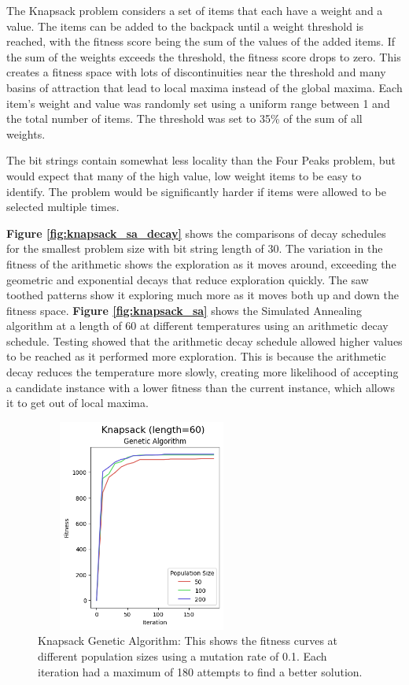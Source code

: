 \documentclass[letterpaper]{article} %
\begin{document}
The Knapsack problem considers a set of items that each have a weight and a value.  The items can be added to the backpack until a weight threshold is reached, with the fitness score being the sum of the values of the added items.  If the sum of the weights exceeds the threshold, the fitness score drops to zero.  This creates a fitness space with lots of discontinuities near the threshold and many basins of attraction that lead to local maxima instead of the global maxima.   Each item's weight and value was randomly set using a uniform range between 1 and the total number of items.  The threshold was set to 35\% of the sum of all weights.

The bit strings contain somewhat less locality than the Four Peaks problem, but would expect that many of the high value, low weight items to be easy to identify.  The problem would be significantly harder if items were allowed to be selected multiple times.

\textbf{Figure \ref{fig:knapsack_sa_decay}} shows the comparisons of decay schedules for the smallest problem size with bit string length of 30.  The variation in the fitness of the arithmetic shows the exploration as it moves around, exceeding the geometric and exponential decays that reduce exploration quickly.  The saw toothed patterns show it exploring much more as it moves both up and down the fitness space.  \textbf{Figure \ref{fig:knapsack_sa}} shows the Simulated Annealing algorithm at a length of 60 at different temperatures using an arithmetic decay schedule.  Testing showed that the arithmetic decay schedule allowed higher values to be reached as it performed more exploration.  This is because the arithmetic decay reduces the temperature more slowly, creating more likelihood of accepting a candidate instance with a lower fitness than the current instance, which allows it to get out of local maxima.  

\begin{figure}[!htb]
\centering
\includegraphics[width=2.75in, height=2.75in]{figures/Knapsack_length=60_Genetic_Algorithm_l_60_ma_60_p_50__100__200_mu_0.1_.png}
\caption{Knapsack Genetic Algorithm: This shows the fitness curves at different population sizes using a mutation rate of 0.1. Each iteration had a maximum of 180 attempts to find a better solution. }
\label{fig:knapsack_ga}
\end{figure}
\end{document}
